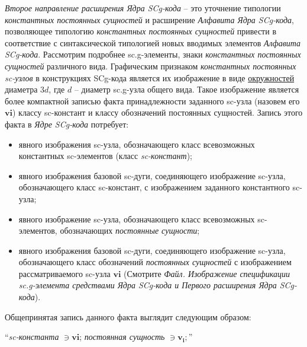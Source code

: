\textit{Второе направление расширения Ядра SCg-кода} -- это уточнение типологии \textit{константных постоянных сущностей} и расширение \textit{Алфавита Ядра SCg-кода}, позволяющее типологию \textit{константных постоянных сущностей} привести в соответствие с синтаксической типологией новых вводимых элементов \textit{Алфавита SCg-кода}. Рассмотрим подробнее sc.g-элементы, знаки \textit{константных постоянных сущностей} различного вида. Графическим признаком \textit{константных постоянных sc-узлов} в конструкциях SCg-кода является их изображение в виде \uline{окружностей} диаметра $3d$, где $d$ -- диаметр sc.g-узла общего вида. Такое изображение является более компактной записью факта принадлежности заданного sc-узла (назовем его $\bm{vi}$) классу sc-констант и классу обозначений постоянных сущностей. Запись этого факта в \textit{Ядре SCg-кода} потребует:
\begin{itemize}
	\item явного изображения sc-узла, обозначающего класс всевозможных константных sc-элементов (класс \textit{sc-констант});  
	\item явного изображения базовой sc-дуги, соединяющего изображение sc-узла, обозначающего класс sc-констант, с изображением заданного константного sc-узла; 
	\item явного изображение sc-узла, обозначающего класс всевозможных sc-элементов, обозначающих \textit{постоянные сущности};
	\item явного изображения базовой sc-дуги, соединяющего изображение sc-узла, обозначающего класс обозначений \textit{постоянных сущностей} с изображением рассматриваемого sc-узла $\bm{vi}$ (Смотрите \textit{Файл. Изображение спецификации sc.g-элемента средствами Ядра SCg-кода и Первого расширения Ядра SCg-кода}).
\end{itemize}

\bigskip
Общепринятая запись данного факта выглядит следующим образом:

``\textit{sc-константа} $\ni \bm{vi}$; \textit{постоянная сущность} $\ni \bm{v_i};$''
\bigskip


